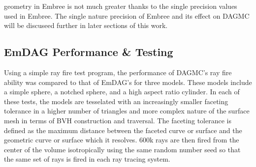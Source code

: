 \documentclass[10pt, a4paper]{article}
\begin{document}
geometry in Embree is not much greater thanks to the single precision values used in Embree. The single nature precision of Embree and its effect on DAGMC will be discuseed further in later sections of this work.

\subsection{EmDAG Performance \& Testing}

Using a simple ray fire test program, the performance of DAGMC's ray fire ability was compared to that of EmDAG's for three models. These models include a simple sphere, a notched sphere, and a high aspect ratio cylinder. In each of these tests, the models are tesselated with an increasingly smaller faceting tolerance in a higher number of triangles and more complex nature of the surface mesh in terms of BVH construction and traversal. The faceting tolerance is defined as the maximum distance between the faceted curve or surface and the geometric curve or surface which it resolves. 600k rays are then fired from the center of the volume isotropically using the same random number seed so that the same set of rays is fired in each ray tracing system.
\end{document}
